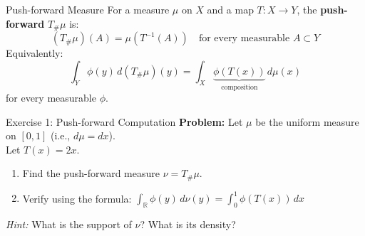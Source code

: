 \documentclass[aspectratio=169]{beamer}
\newcommand{\R}{\mathbb{R}}
\begin{document}
\begin{frame}{Push-forward Measure}
For a measure $\mu$ on $X$ and a map $T: X \to Y$, the \textbf{push-forward} $T_\#\mu$ is:
\[
(T_\#\mu)(A) = \mu(T^{-1}(A)) \quad \text{for every measurable } A \subset Y
\]
Equivalently:
\[
\int_Y \phi(y) \, d(T_\#\mu)(y) = \int_X \underbrace{\phi(T(x))}_{\text{composition}} \, d\mu(x)
\]
for every measurable $\phi$.

\vspace{0.3cm}
\begin{center}
\end{center}
\end{frame}

\begin{frame}{Exercise 1: Push-forward Computation}
\textbf{Problem:} Let $\mu$ be the uniform measure on $[0,1]$ (i.e., $d\mu = dx$).\\
Let $T(x) = 2x$.

\vspace{0.5cm}
\begin{enumerate}
    \item[(a)] Find the push-forward measure $\nu = T_\#\mu$.
    \item[(b)] Verify using the formula: $\int_{\R} \phi(y)\,d\nu(y) = \int_0^1 \phi(T(x))\,dx$
\end{enumerate}

\vspace{0.5cm}
\textit{Hint:} What is the support of $\nu$? What is its density?
\end{frame}
\end{document}
